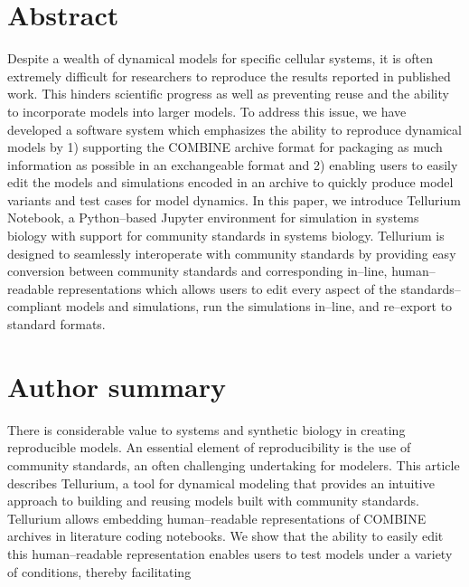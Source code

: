 \documentclass[10pt,letterpaper]{article}
\begin{document}
\section*{Abstract}
Despite a wealth of dynamical models for specific cellular systems, it is often extremely difficult for researchers to reproduce the results reported in published work. This hinders scientific progress as well as preventing reuse and the ability to incorporate models into larger models. To address this issue, we have developed a software system which emphasizes the ability to reproduce dynamical models by 1) supporting the COMBINE archive format for packaging as much information as possible in an exchangeable format and 2) enabling users to easily edit the models and simulations encoded in an archive to quickly produce model variants and test cases for model dynamics. In this paper, we introduce Tellurium Notebook, a Python--based Jupyter environment for simulation in systems biology with support for community standards in systems biology. Tellurium is designed to seamlessly interoperate with community standards by providing easy conversion between community standards and corresponding in--line, human--readable representations which allows users to edit every aspect of the standards--compliant models and simulations, run the simulations in--line, and re--export to standard formats.

\section*{Author summary}
There is considerable value to systems and synthetic biology  in creating reproducible models. An essential element of reproducibility  is the use of community standards, an often challenging undertaking for modelers. This article describes Tellurium, a tool for dynamical modeling that provides an intuitive approach to building and reusing models built with community standards. Tellurium allows embedding human--readable representations of COMBINE archives in literature coding notebooks. We show that the ability to easily edit this human--readable representation enables users to test models under a variety of conditions, thereby facilitating
%
%
\end{document}
